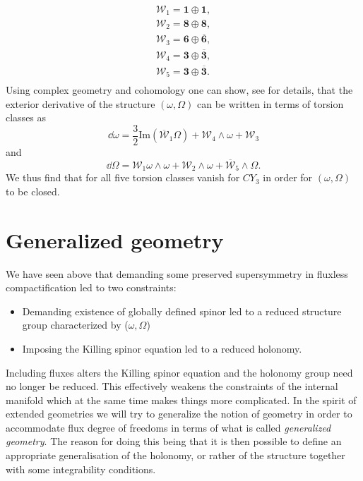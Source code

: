 \begin{align*}
    \mathscr{W}_1 = \mathbf{1}\oplus\mathbf{1},\\
    \mathscr{W}_2 = \mathbf{8}\oplus\mathbf{8},\\
    \mathscr{W}_3 = \mathbf{6}\oplus\overbar{\mathbf{6}},\\
    \mathscr{W}_4 = \mathbf{3}\oplus\overbar{\mathbf{3}},\\
    \mathscr{W}_5 = \mathbf{3}\oplus\overbar{\mathbf{3}}.\\
\end{align*}
Using complex geometry and cohomology one can show, see \cite{Blumenhagen2013} for details, that the exterior derivative of the structure $(\omega,\Omega)$ can be written in terms of torsion classes as 
\begin{equation}
    \dd \omega = \frac{3}{2}\text{Im}(\overbar{\mathscr{W}}_1\Omega)+\mathscr{W}_4\wedge \omega+\mathscr{W}_3
\end{equation}
and 
\begin{equation}
    \dd \Omega = \mathscr{W}_1\omega\wedge\omega+\mathscr{W}_2\wedge\omega+\overbar{\mathscr{W}}_5\wedge\Omega.
\end{equation}
We thus find that for all five torsion classes vanish for $CY_3$ in order for $(\omega,\Omega)$ to be closed. 



\section{Generalized geometry}
We have seen above that demanding some preserved supersymmetry in fluxless compactification led to two constraints:
\begin{itemize}
    \item Demanding existence of globally defined spinor led to a reduced structure group characterized by ($\omega,\Omega$)
    \item Imposing the Killing spinor equation led to a reduced holonomy. 
\end{itemize}
Including fluxes alters the Killing spinor equation and the holonomy group need no longer be reduced. This effectively weakens the constraints of the internal manifold which at the same time makes things more complicated. In the spirit of extended geometries we will try to generalize the notion of geometry in order to accommodate flux degree of freedoms in terms of what is called \emph{generalized geometry}. The reason for doing this being that it is then possible to define an appropriate generalisation of the holonomy, or rather of the structure together with some integrability conditions. 

